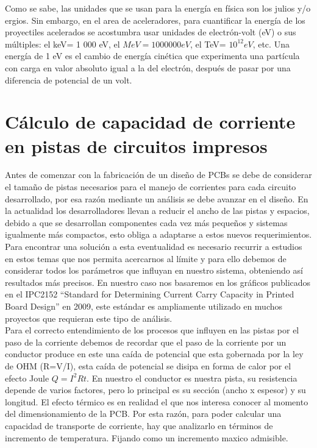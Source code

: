 Como se sabe, las unidades que se usan para la energía en física son los julios
y/o ergios. Sin embargo, en el area de aceleradores, para cuantificar la energía de los proyectiles acelerados se acostumbra usar unidades de electrón-volt (eV)  o sus múltiples: el keV= 1 000 eV, el $MeV= 1 000 000 eV$, el TeV= $10^{12} eV$, etc. Una energía de 1 eV es el cambio de energía cinética que experimenta una partícula con carga en valor absoluto igual a la del electrón, después de pasar por una diferencia de potencial de un volt. \cite{const}

\newpage
\section{Cálculo de capacidad de corriente en pistas de circuitos impresos}



Antes de comenzar con la fabricación de un diseño de PCBs se debe de considerar el tamaño de pistas necesarios para el manejo de corrientes para cada circuito desarrollado, por esa razón mediante un análisis se debe avanzar en el diseño. En la actualidad los desarrolladores llevan a reducir el ancho de las pistas y espacios, debido a que se desarrollan componentes cada vez más pequeños y sistemas igualmente más compactos, esto obliga a adaptarse a estos nuevos requerimientos.\\

Para encontrar una solución a esta eventualidad es necesario recurrir a estudios en estos temas que nos permita acercarnos al límite y para ello debemos de considerar todos los parámetros que influyan en nuestro sistema, obteniendo así resultados más precisos. En nuestro caso nos basaremos en los gráficos publicados en el IPC2152 \cite{IPC 2152} ``Standard for Determining Current Carry Capacity in Printed Board Design'' en 2009, este estándar es ampliamente utilizado en muchos proyectos que requieran este tipo de análisis. \\  

Para el correcto entendimiento de los procesos que influyen en las pistas por el paso de la corriente debemos de recordar que el paso de la corriente por un conductor produce en este una caída de potencial que esta gobernada por la ley de OHM (R=V/I), esta caída de potencial se disipa en forma de calor por el efecto Joule $Q=I^{2}Rt$. En nuestro el conductor es nuestra pista, su resistencia depende de varios factores, pero lo principal es su sección (ancho x espesor) y su longitud. El efecto térmico es en realidad el que nos interesa conocer al momento del dimensionamiento de la PCB. Por esta razón, para poder calcular una capacidad de transporte de corriente, hay que analizarlo en términos de incremento de temperatura. Fijando como un incremento maxico admisible.\\

